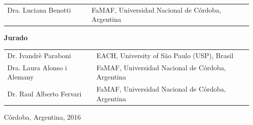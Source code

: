 \begin{center}
\begin{tabular}{ll}
Dra. Luciana Benotti $~~~~~~~~~~$ & FaMAF, Universidad Nacional de C\'ordoba, Argentina
\end{tabular}

\vspace{5mm}
\textbf{Jurado}

\vspace{5mm}

\begin{tabular}{ll}
Dr. Ivandr\`e Paraboni & EACH, University of S\~ao Paulo (USP), Brasil \\
Dra. Laura Alonso i Alemany & FaMAF, Universidad Nacional de C\'ordoba, Argentina \\
Dr. Raul Alberto Fervari & FaMAF, Universidad Nacional de C\'ordoba, Argentina \\
\end{tabular}

\vspace{5mm}

\end{center}
\noindent C\'ordoba, Argentina, 2016
\newpage
\mbox{}
\thispagestyle{empty}
